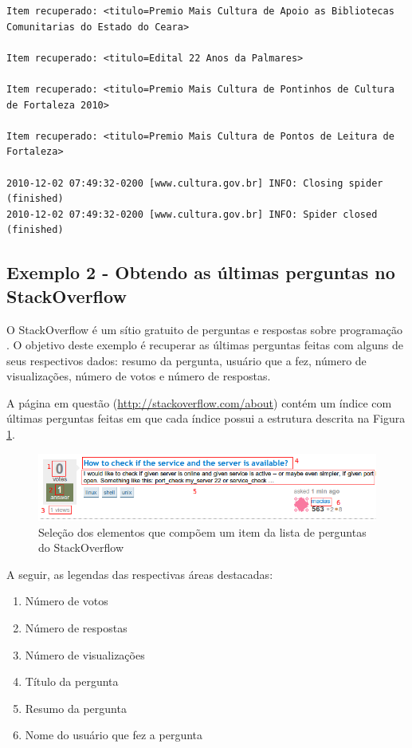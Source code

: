 \begin{lstlisting}[label=scrapy_wpt_minc]
Item recuperado: <titulo=Premio Mais Cultura de Apoio as Bibliotecas Comunitarias do Estado do Ceara> 

Item recuperado: <titulo=Edital 22 Anos da Palmares> 

Item recuperado: <titulo=Premio Mais Cultura de Pontinhos de Cultura de Fortaleza 2010> 

Item recuperado: <titulo=Premio Mais Cultura de Pontos de Leitura de Fortaleza> 

2010-12-02 07:49:32-0200 [www.cultura.gov.br] INFO: Closing spider (finished)
2010-12-02 07:49:32-0200 [www.cultura.gov.br] INFO: Spider closed (finished)
\end{lstlisting}


\subsection{Exemplo 2 - Obtendo as últimas perguntas no StackOverflow}

O StackOverflow é um sítio gratuito de perguntas e respostas sobre programação \cite{stackoverflow}. O objetivo deste exemplo é recuperar as últimas perguntas feitas com alguns de seus respectivos dados: resumo da pergunta, usuário que a fez, número de visualizações, número de votos e número de respostas.

A página em questão (\url{http://stackoverflow.com/about}) contém um índice com últimas perguntas feitas em que cada índice possui a estrutura descrita na Figura \ref{stackoverflow}.

\begin{figure} [ht]
	\centering
	\includegraphics[scale=0.8]{stackoverflow.png}
	\caption{Seleção dos elementos que compõem um item da lista de perguntas do StackOverflow}
	\label{stackoverflow}
\end{figure}

A seguir, as legendas das respectivas áreas destacadas:

\begin{enumerate}
	\item Número de votos
	\item Número de respostas
	\item Número de visualizações
	\item Título da pergunta
	\item Resumo da pergunta
	\item Nome do usuário que fez a pergunta
\end{enumerate}

